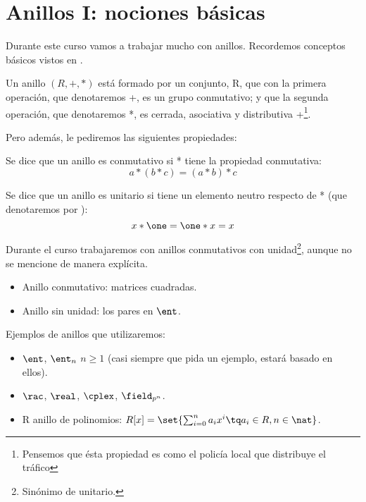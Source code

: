 \chapter{Anillos I: nociones básicas}

Durante este curso vamos a trabajar mucho con anillos. Recordemos conceptos básicos vistos en \cite{apuntesEA}.

\begin{defn}[Anillo]
Un anillo $(R, +, * )$ está formado por un conjunto, R, que con la primera operación, que denotaremos +, es un grupo conmutativo; y que la segunda operación, que denotaremos *, es cerrada, asociativa y distributiva \wrt +\footnote{Pensemos que ésta propiedad es como el policía local que distribuye el tráfico}.
\end{defn}

Pero además, le pediremos las siguientes propiedades:

\begin{defn}
Se dice que un anillo es conmutativo si * tiene la propiedad conmutativa:
\[ a*(b*c) = (a*b)*c \]
\end{defn}

\begin{defn}
Se dice que un anillo es unitario si tiene un elemento neutro respecto de * (que denotaremos por \one):
\[ x*\one = \one*x = x \]
\end{defn}

\obs Durante el curso trabajaremos con anillos conmutativos con unidad\footnote{Sinónimo de unitario.}, aunque no se mencione de manera explícita.

\begin{example}
\begin{itemize}
	\item Anillo conmutativo: matrices cuadradas.
	\item Anillo sin unidad: los pares en $\ent$.
\end{itemize}
\end{example}

Ejemplos de anillos que utilizaremos:

\begin{example}
\begin{itemize}
	\item $\ent$, $\ent_n$ $n \geq 1$ (casi siempre que pida un ejemplo, estará basado en ellos).
	\item $\rac$, $\real$, $\cplex$, $\field_{p^n}$.
	\item R anillo de polinomios: $R[x] = \set{ \sum_{i=0}^n a_i x^i \tq a_i \in R, n \in \nat}$.
\end{itemize}
\end{example}

